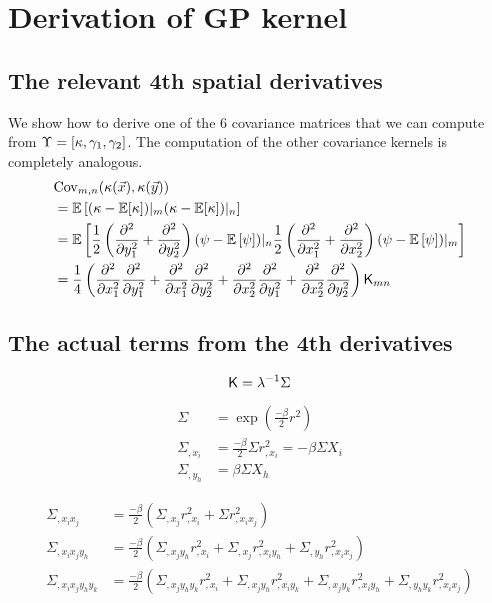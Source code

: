 \appendix 

\section{Derivation of GP kernel}


\subsection{The relevant 4th spatial derivatives}
We show how to derive one of the 6  covariance matrices that we can compute
from $\Upsilon = [\kappa, \gamma_1, \gamma_2]$. The computation of the other
covariance kernels is completely analogous.
\begin{align*}
&{\rm Cov}_{m,n} (\kappa(\vec{x}), \kappa(\vec{y}))  \\ 
&= \mathbb{E} \left[ 
	(\kappa - \mathbb{E}[\kappa])|_m 
( \kappa - \mathbb{E}[\kappa])|_n\right] 
\\
 &=\mathbb{E}\left[
\frac{1}{2} \left(\frac{\partial^2}{\partial y_1^2} + 
\frac{\partial^2}{\partial y_2^2}\right) 
 (\psi - \mathbb{E}\left[\psi\right])|_n \frac{1}{2}
\left(\frac{\partial^2}{\partial x_1^2} + \frac{\partial^2}{\partial x_2^2} \right)
(\psi - \mathbb{E}\left[\psi\right])|_m \right]
\\
&= \frac{1}{4}\left(
\frac{\partial^2}{\partial x_1^2} \frac{\partial^2}{\partial y_1^2} + 
\frac{\partial^2}{\partial x_1^2} \frac{\partial^2}{\partial y_2^2} +  
\frac{\partial^2}{\partial x_2^2} \frac{\partial^2}{\partial y_1^2} + 
\frac{\partial^2}{\partial x_2^2} \frac{\partial^2}{\partial y_2^2}  
\right) \mathsf{K}_{mn}\\ 
\end{align*}


\subsection{The actual terms from the 4th derivatives}
\begin{equation*}
\mathsf{K} = \lambda^{-1} \Sigma 
\end{equation*}

\begin{align}
\Sigma &= \exp{\left(\frac{-\beta}{2} r^2 \right)}\\
\Sigma_{,x_i} &= \frac{-\beta}{2} \Sigma r^2_{,x_i} = -\beta \Sigma X_i\\ 
\Sigma_{,y_h} &= \beta \Sigma X_h 
\end{align}

\begin{align}
\Sigma_{,x_i x_j} &= \frac{-\beta}{2}(\Sigma_{,x_j} r^2_{,x_i} + \Sigma r^2_{,x_i x_j})\\
\Sigma_{,x_i x_j y_h} &= \frac{-\beta}{2}(\Sigma_{,x_j y_h} r^2_{,x_i} + \Sigma_{,x_j}
r^2_{,x_i y_h} + \Sigma_{,y_h} r^2_{,x_i x_j})\\
\Sigma_{,x_i x_j y_h y_k} &= \frac{-\beta}{2} 
(\Sigma_{,x_j y_h y_k} r^2_{,x_i} +
\Sigma_{,x_j y_h} r^2_{,x_i y_k} + 
\Sigma_{,x_j y_k} r^2_{,x_i y_h} + 
\Sigma_{,y_h y_k} r^2_{,x_i x_j} )
\label{eq:4th_derivative_intermediate_expression}
\end{align}

